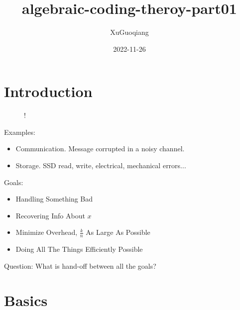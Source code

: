 \documentclass[12pt]{article}
\title{algebraic-coding-theroy-part01}
\date{2022-11-26}
\author{XuGuoqiang}
\begin{document}
\maketitle

\section*{Introduction}

\begin{figure}[h!]
    \begin{center}
        \resizebox {!} {!} {
        }
    \end{center}
\end{figure}

Examples:
\begin{itemize}
    \item Communication. Message corrupted in a noisy channel.
    \item Storage. SSD read, write, electrical, mechanical errors...
\end{itemize}

Goals:
\begin{itemize}
    \item Handling Something Bad
    \item Recovering Info About $x$
    \item Minimize Overhead, $\frac{k}{n}$ As Large As Possible
    \item Doing All The Things Efficiently Possible
\end{itemize}

Question: What is hand-off between all the goals?

\section*{Basics}
\end{document}
